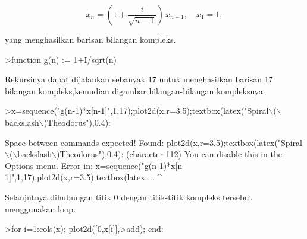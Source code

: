 \documentclass{article}
\begin{document}
\begin{eulernotebook}
\begin{eulercomment}
\begin{eulercomment}
\begin{eulercomment}
\begin{eulercomment}
\begin{eulercomment}
\begin{eulercomment}
\begin{eulercomment}
\begin{eulercomment}
\begin{eulercomment}
\begin{eulercomment}
\begin{eulercomment}
\begin{eulercomment}
\begin{eulercomment}
\begin{eulercomment}
\begin{eulercomment}
\begin{eulercomment}
\begin{eulercomment}
\begin{eulercomment}
\begin{eulercomment}
\begin{eulercomment}
\begin{eulercomment}
\begin{eulercomment}
\begin{eulercomment}
\begin{eulercomment}
\begin{eulercomment}
\begin{eulercomment}
\begin{eulercomment}
\begin{eulercomment}
\begin{eulercomment}
\begin{eulercomment}
\begin{eulercomment}
\end{eulercomment}
\begin{eulerformula}
\[
x_n = \left( 1 + \frac{i}{\sqrt{n-1}} \right) \, x_{n-1}, \quad x_1=1,
\]
\end{eulerformula}
\begin{eulercomment}
yang menghasilkan barisan bilangan kompleks.
\end{eulercomment}
\begin{eulerprompt}
>function g(n) := 1+I/sqrt(n)
\end{eulerprompt}
\begin{eulercomment}
Rekursinya dapat dijalankan sebanyak 17 untuk menghasilkan barisan 17
bilangan kompleks,kemudian digambar bilangan-bilangan kompleksnya.
\end{eulercomment}
\begin{eulerprompt}
>x=sequence("g(n-1)*x[n-1]",1,17);plot2d(x,r=3.5);textbox(latex("Spiral\(\backslash\)(\(\backslash\)backslash\(\backslash\))Theodorus"),0.4):
\end{eulerprompt}
\begin{euleroutput}
  Space between commands expected!
  Found: plot2d(x,r=3.5);textbox(latex("Spiral\(\backslash\)(\(\backslash\)backslash\(\backslash\))Theodorus"),0.4): (character 112)
  You can disable this in the Options menu.
  Error in:
  x=sequence("g(n-1)*x[n-1]",1,17);plot2d(x,r=3.5);textbox(latex ...
                                   ^
\end{euleroutput}
\begin{eulercomment}
Selanjutnya dihubungan titik 0 dengan titik-titik kompleks tersebut
menggunakan loop.
\end{eulercomment}
\begin{eulerprompt}
>for i=1:cols(x); plot2d([0,x[i]],>add); end:
\end{eulerprompt}
\begin{eulercomment}

\end{eulercomment}
\end{eulercomment}
\end{eulercomment}
\end{eulercomment}
\end{eulercomment}
\end{eulercomment}
\end{eulercomment}
\end{eulercomment}
\end{eulercomment}
\end{eulercomment}
\end{eulercomment}
\end{eulercomment}
\end{eulercomment}
\end{eulercomment}
\end{eulercomment}
\end{eulercomment}
\end{eulercomment}
\end{eulercomment}
\end{eulercomment}
\end{eulercomment}
\end{eulercomment}
\end{eulercomment}
\end{eulercomment}
\end{eulercomment}
\end{eulercomment}
\end{eulercomment}
\end{eulercomment}
\end{eulercomment}
\end{eulercomment}
\end{eulercomment}
\end{eulercomment}
\end{eulernotebook}
\end{document}
